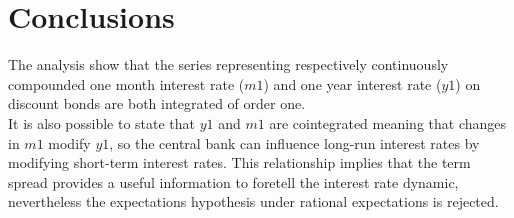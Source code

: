 \documentclass[12pt]{article}
\begin{document}
\section{Conclusions} \label{sec:4}
The analysis show that the series representing respectively continuously compounded one month interest  rate ($m1$) and one year interest rate ($y1$) on discount bonds are both integrated of order one. 
\\ It is also possible to state that $y1$ and $m1$ are cointegrated meaning that changes in $m1$ modify $y1$, so the central bank can influence long-run interest rates by modifying short-term interest rates. This relationship implies that the term spread provides a useful information to foretell the interest rate dynamic, nevertheless the expectations hypothesis under rational expectations is rejected. 
\end{document}
